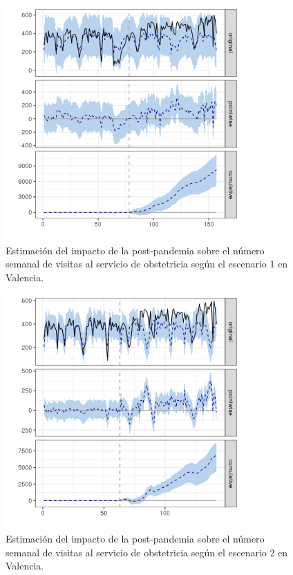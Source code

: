 \documentclass[12pt,twoside]{article} %
\begin{document}
    \begin{center}
    \begin{figure}[H]
    \includegraphics[width=9cm]{obstetrics_post_scen1_Valencia.png}\caption{Estimación del impacto de la post-pandemia sobre el número semanal de visitas al servicio de obstetricia según el escenario 1 en Valencia.}
    \end{figure}
    \end{center}
    
    \begin{center}
      \begin{figure}[H]
        \includegraphics[width=9cm]{obstetrics_post_scen2_Valencia.png}\caption{Estimación del impacto de la post-pandemia sobre el número semanal de visitas al servicio de obstetricia según el escenario 2 en Valencia.}
      \end{figure}
      \end{center}
\end{document}
